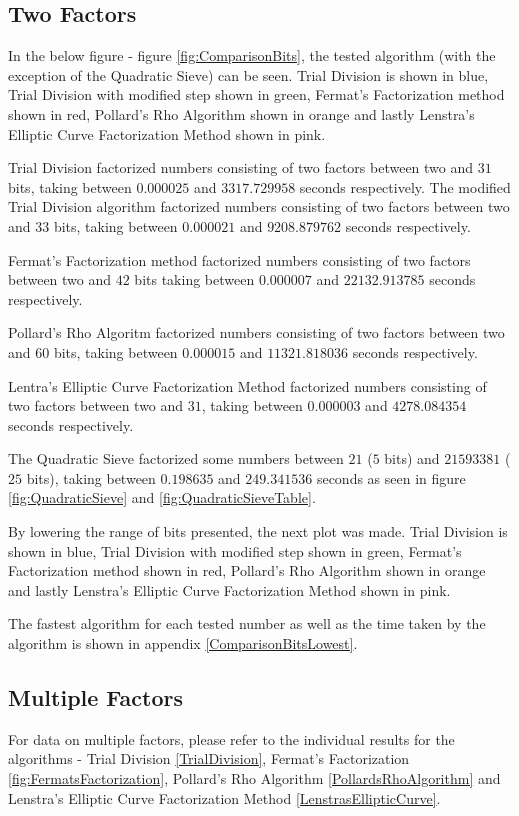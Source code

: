 \subsection{Two Factors}

In the below figure - figure \ref{fig:ComparisonBits}, the tested algorithm (with the exception of the Quadratic Sieve) can be seen. Trial Division is shown in blue, Trial Division with modified step shown in green, Fermat's Factorization method shown in red, Pollard's Rho Algorithm shown in orange and lastly Lenstra's Elliptic Curve Factorization Method shown in pink.



Trial Division factorized numbers consisting of two factors between two and $31$ bits, taking between $0.000025$ and $3317.729958$ seconds respectively. The modified Trial Division algorithm factorized numbers consisting of two factors between two and $33$ bits, taking between $0.000021$ and $9208.879762$ seconds respectively.

Fermat's Factorization method factorized numbers consisting of two factors between two and $42$ bits taking between $0.000007$ and $22132.913785$ seconds respectively.

Pollard's Rho Algoritm factorized numbers consisting of two factors between two and $60$ bits, taking between $0.000015$ and $11321.818036$ seconds respectively.

Lentra's Elliptic Curve Factorization Method factorized numbers consisting of two factors between two and $31$, taking between $0.000003$ and $4278.084354$ seconds respectively.

The Quadratic Sieve factorized some numbers between $21$ ($5$ bits) and $21593381$ ($25$ bits), taking between $0.198635$ and $249.341536$ seconds as seen in figure \ref{fig:QuadraticSieve} and \ref{fig:QuadraticSieveTable}.

By lowering the range of bits presented, the next plot was made. Trial Division is shown in blue, Trial Division with modified step shown in green, Fermat's Factorization method shown in red, Pollard's Rho Algorithm shown in orange and lastly Lenstra's Elliptic Curve Factorization Method shown in pink.





The fastest algorithm for each tested number as well as the time taken by the algorithm is shown in appendix \ref{ComparisonBitsLowest}.

\subsection{Multiple Factors}

For data on multiple factors, please refer to the individual results for the algorithms - Trial Division \ref{TrialDivision}, Fermat's Factorization \ref{fig:FermatsFactorization}, Pollard's Rho Algorithm \ref{PollardsRhoAlgorithm} and Lenstra's Elliptic Curve Factorization Method \ref{LenstrasEllipticCurve}.